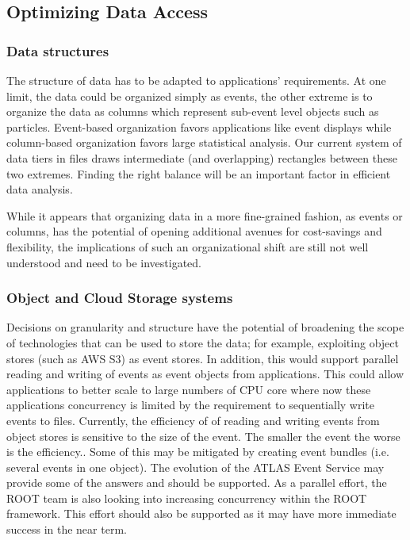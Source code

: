 \documentclass[12pt,a4paper]{article}
\begin{document}
\subsection{Optimizing Data Access}\label{optimizing-data-access}

\subsubsection{Data structures}\label{data-structures}

The structure of data has to be adapted to applications' requirements.
At one limit, the data could be organized simply as events, the other
extreme is to organize the data as columns which represent sub-event
level objects such as particles. Event-based organization favors
applications like event displays while column-based organization favors
large statistical analysis. Our current system of data tiers in files
draws intermediate (and overlapping) rectangles between these two
extremes. Finding the right balance will be an important factor in
efficient data analysis.

While it appears that organizing data in a more fine-grained fashion, as
events or columns, has the potential of opening additional avenues for
cost-savings and flexibility, the implications of such an organizational
shift are still not well understood and need to be investigated.

\subsubsection{Object and Cloud Storage
systems}\label{object-and-cloud-storage-systems}

Decisions on granularity and structure have the potential of broadening
the scope of technologies that can be used to store the data; for
example, exploiting object stores (such as AWS S3) as event stores. In
addition, this would support parallel reading and writing of events as
event objects from applications. This could allow applications to better
scale to large numbers of CPU core where now these applications
concurrency is limited by the requirement to sequentially write events
to files. Currently, the efficiency of of reading and writing events
from object stores is sensitive to the size of the event. The smaller
the event the worse is the efficiency.. Some of this may be mitigated by
creating event bundles (i.e. several events in one object). The
evolution of the ATLAS Event Service may provide some of the answers and
should be supported. As a parallel effort, the ROOT team is also looking
into increasing concurrency within the ROOT framework. This effort
should also be supported as it may have more immediate success in the
near term.
\end{document}
